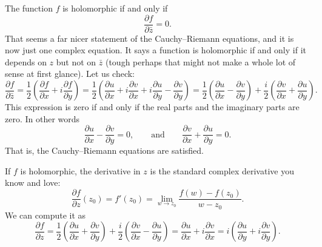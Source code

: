 \documentclass[12pt,openany]{book}
\theoremstyle{plain}
\theoremstyle{remark}
\theoremstyle{definition}
\theoremstyle{exercise}
\theoremstyle{example}
\begin{document}
The function $f$ is holomorphic if and only if
\begin{equation*}
\frac{\partial f}{\partial \bar{z}} = 0 .
\end{equation*}
That seems a far nicer statement of the Cauchy--Riemann equations, and it is
now just one complex equation.  It says
a function is holomorphic if and only if it depends on $z$ but not on
$\bar{z}$ (tough perhaps that might not make a whole lot of sense at first
glance).
Let us check:
\begin{equation*}
\frac{\partial f}{\partial \bar{z}} 
=
\frac{1}{2}
\left(
\frac{\partial f}{\partial x} + i
\frac{\partial f}{\partial y}
\right)
=
\frac{1}{2}
\left(
\frac{\partial u}{\partial x} 
+ i \frac{\partial v}{\partial x} 
+ i \frac{\partial u}{\partial y}
- \frac{\partial v}{\partial y}
\right) 
=
\frac{1}{2}
\left(
\frac{\partial u}{\partial x} 
- \frac{\partial v}{\partial y}
\right)
+
\frac{i}{2}
\left(
\frac{\partial v}{\partial x} 
+ \frac{\partial u}{\partial y}
\right) .
\end{equation*}
This expression is zero if and only if the real parts and the imaginary
parts are zero.  In other words %
\begin{equation*}
\frac{\partial u}{\partial x} 
- \frac{\partial v}{\partial y}
= 0,
\qquad
\text{and}
\qquad
\frac{\partial v}{\partial x} 
+ \frac{\partial u}{\partial y} = 0
.
\end{equation*}
That is, the Cauchy--Riemann equations are satisfied.

If $f$ is holomorphic, the derivative in $z$ is the standard complex derivative you know and love:
\begin{equation*}
\frac{\partial f}{\partial z} (z_0)
=
f'(z_0)
=
\lim_{w \to z_0} \frac{f(w)-f(z_0)}{w-z_0} .
\end{equation*}
We can compute it as
\begin{equation*}
\frac{\partial f}{\partial z} 
=
\frac{1}{2}
\left(
\frac{\partial u}{\partial x} 
+ \frac{\partial v}{\partial y}
\right)
+
\frac{i}{2}
\left( \frac{\partial v}{\partial x} - \frac{\partial u}{\partial y}
\right) 
=
\frac{\partial u}{\partial x} 
+ i \frac{\partial v}{\partial x}
=
i \left(
\frac{\partial u}{\partial y}
+ i
\frac{\partial v}{\partial y} 
\right)
.
\end{equation*}
\end{document}
